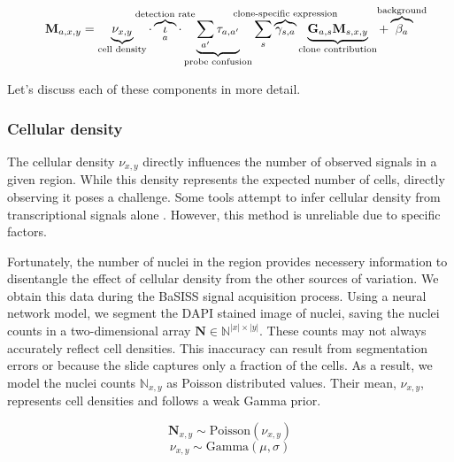 \begin{equation} 
\mathbf{M}_{a, x,y} = \underbrace{\nu_{x,y}}_{\text{cell density}} \cdot \overbrace{\iota}_a^{\mathclap{\text{detection rate}}} \cdot \underbrace{\sum_{a'} \tau_{a,a'}}_{\text{probe confusion}} \sum_s  \overbrace{\gamma_{s,a}}^{\mathclap{\text{clone-specific expression}}} \underbrace{\mathbf{G}_{a,s} \mathbf{M}_{s,x,y}}_{\text{clone contribution}} + \overbrace{\beta_a}^{\mathclap{\text{background}}}
\label{eq:ED_full}\\
\end{equation} 

Let's discuss each of these components in more detail.

\subsubsection*{Cellular density}
The cellular density $\nu_{x,y}$ directly influences the number of observed signals in a given region. While this density represents the expected number of cells, directly observing it poses a challenge. Some tools attempt to infer cellular density from transcriptional signals alone \parencite{Kleshchevnikov2022-ch}. However, this method is unreliable due to  specific factors.

Fortunately, the number of nuclei in the region provides necessery information to disentangle the effect of cellular density from the other sources of variation. We obtain this data during the \ac{BaSISS} signal acquisition process. Using a neural network model, we segment the DAPI stained image of nuclei, saving the nuclei counts in a two-dimensional array $\mathbf{N} \in \mathbb{N}^{|x| \times |y|}$. These counts may not always accurately reflect cell densities. This inaccuracy can result from segmentation errors or because the slide captures only a fraction of the cells. As a result, we model the nuclei counts $\mathbb{N}_{x,y}$ as Poisson distributed values. Their mean, $\nu_{x,y}$, represents cell densities and follows a weak Gamma prior.

\begin{equation}
    \mathbf{N}_{x,y} \sim \text{Poisson}({\nu}_{x,y})
\end{equation}
\begin{equation}
    {\nu}_{x,y} \sim \text{Gamma}(\mu, \sigma)
\end{equation}


